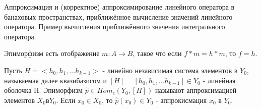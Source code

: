 \documentclass[__main__.tex]{subfiles}
\begin{document}
Аппроксимация и (корректное) аппроксимирование линейного оператора в банаховых пространствах, приближённое вычисление значений линейного оператора. Пример вычисления приближённого значения интегрального оператора.

\begin{definition}
	Эпиморфизм есть отображение $m: A \rightarrow B$, такое что если $f*m = h*m$, то $f=h$. 
\end{definition}

\begin{definition}
Пусть $H = <h_0, h_1, ... h_{k-1}>$ - линейно независимая система элементов в $Y_0$, называемая далее квазибазисом и $[H] = [h_0, h_1, ... h_{k-1}] \in Y_0$ - линейная оболочка H. Эпиморфизм $\hat{p} \in Hom_{c}(Y_0, [H])$ называют аппроксимацией элементов $X_0 в Y_0$. Если $x_0 \in X_0$, то $\hat{p}(x_0) \in Y_0$ - аппрокисмация $x_0$ в $Y_0$. 
\end{definition}
\end{document}
